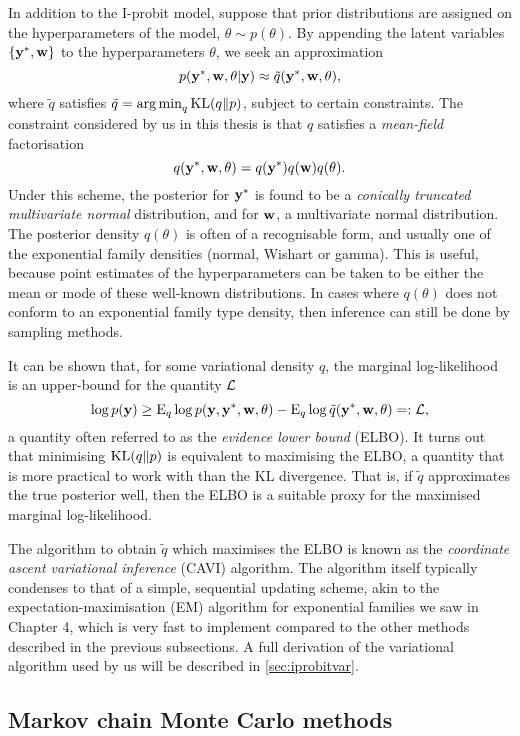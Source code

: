 In addition to the I-probit model, suppose that prior distributions are assigned on the hyperparameters of the model, $\theta \sim p(\theta)$.
By appending the latent variables $\{{\mathbf y}^*,{\mathbf w}\}$ to the hyperparameters $\theta$, we seek an approximation
\[
  p({\mathbf y}^*,{\mathbf w},\theta | {\mathbf y}) \approx \tilde q({\mathbf y}^*,{\mathbf w},\theta),
\]
where $\tilde q$ satisfies $\tilde q = \operatorname*{arg\,min}_q \operatorname{KL}(q\Vert p)$, subject to certain constraints.
The constraint considered by us in this thesis is that $q$ satisfies a \emph{mean-field} factorisation
\[
  q({\mathbf y}^*,{\mathbf w},\theta) = q({\mathbf y}^*)q({\mathbf w})q(\theta).
\]
Under this scheme, the posterior for ${\mathbf y}^*$ is found to be a \emph{conically truncated multivariate normal} distribution, and for ${\mathbf w}$, a multivariate normal distribution.
The posterior density $q(\theta)$ is often of a recognisable form, and usually one of the exponential family densities (normal, Wishart or gamma).
This is useful, because point estimates of the hyperparameters can be taken to be either the mean or mode of these well-known distributions.
In cases where $q(\theta)$ does not conform to an exponential family type density, then inference can still be done by sampling methods.

It can be shown that, for some variational density $q$, the marginal log-likelihood is an upper-bound for the quantity ${\mathcal L}$
\[
  \log p({\mathbf y}) \geq 
    \operatorname{E}_{ q} \log p({\mathbf y},{\mathbf y}^*,{\mathbf w},\theta)
    - \operatorname{E}_{ q} \log \tilde q({\mathbf y}^*,{\mathbf w},\theta) =: {\mathcal L},
\]
a quantity often referred to as the \emph{evidence lower bound} (ELBO).
It turns out that minimising $\operatorname{KL}(q\Vert p)$ is equivalent to maximising the ELBO, a quantity that is more practical to work with than the KL divergence.
That is, if $\tilde q$ approximates the true posterior well, then the ELBO is a suitable proxy for the maximised marginal log-likelihood.

The algorithm to obtain $\tilde q$ which maximises the ELBO is known as the \emph{coordinate ascent variational inference} (CAVI) algorithm.
The algorithm itself typically condenses to that of a simple, sequential updating scheme, akin to the expectation-maximisation (EM) algorithm for exponential families we saw in Chapter 4, which is very fast to implement compared to the other methods described in the previous subsections.
A full derivation of the variational algorithm used by us will be described in \cref{sec:iprobitvar}.

\subsection{Markov chain Monte Carlo methods}

